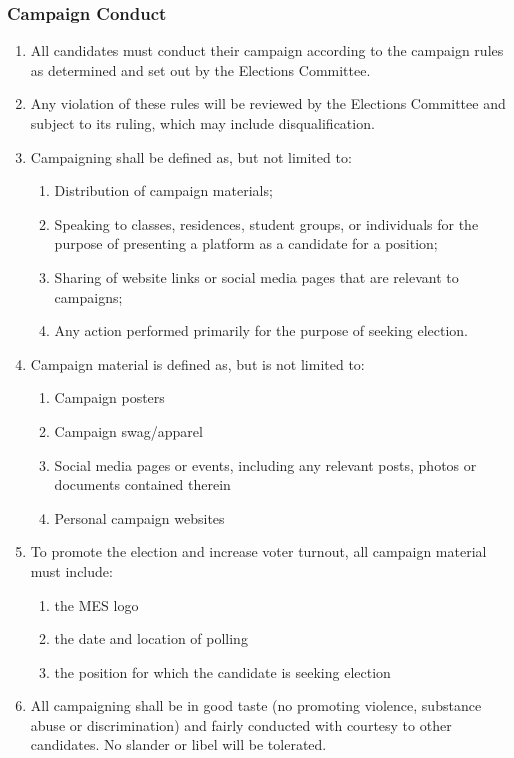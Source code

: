 \subsubsection{Campaign Conduct}
\label{campaign-conduct}
\begin{enumerate}
 \item
  All candidates must conduct their campaign according to the campaign rules as determined and set out by the Elections Committee.
 \item
  Any violation of these rules will be reviewed by the Elections Committee and subject to its ruling, which may include disqualification.
 \item
  Campaigning shall be defined as, but not limited to:

  \begin{enumerate}
   \item
    Distribution of campaign materials;
   \item
    Speaking to classes, residences, student groups, or individuals for the purpose of presenting a platform as a candidate for a position;
   \item
    Sharing of website links or social media pages that are relevant to campaigns;
   \item
    Any action performed primarily for the purpose of seeking election.
  \end{enumerate}
 \item
  Campaign material is defined as, but is not limited to:

  \begin{enumerate}
   \item
    Campaign posters
   \item
    Campaign swag/apparel
   \item
    Social media pages or events, including any relevant posts, photos or documents contained therein
   \item
    Personal campaign websites
  \end{enumerate}
 \item
  To promote the election and increase voter turnout, all campaign material must include:

  \begin{enumerate}
   \item
    the MES logo
   \item
    the date and location of polling
   \item
    the position for which the candidate is seeking election
  \end{enumerate}
 \item
  All campaigning shall be in good taste (no promoting violence, substance abuse or discrimination) and fairly conducted with courtesy to other candidates. No slander or libel will be tolerated.

\end{enumerate}

